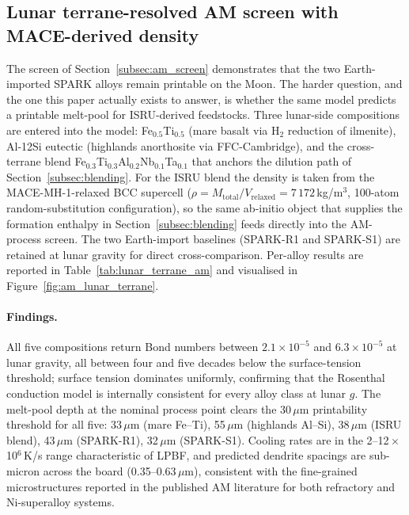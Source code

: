 \documentclass[11pt,a4paper]{article}
\begin{document}
\subsection{Lunar terrane-resolved AM screen with MACE-derived density}
\label{subsec:am_lunar_terranes}

The screen of Section~\ref{subsec:am_screen} demonstrates that the two Earth-imported SPARK alloys remain printable on the Moon. The harder question, and the one this paper actually exists to answer, is whether the same model predicts a printable melt-pool for ISRU-derived feedstocks. Three lunar-side compositions are entered into the model: Fe$_{0.5}$Ti$_{0.5}$ (mare basalt via H$_2$ reduction of ilmenite), Al-12Si eutectic (highlands anorthosite via FFC-Cambridge), and the cross-terrane blend Fe$_{0.3}$Ti$_{0.3}$Al$_{0.2}$Nb$_{0.1}$Ta$_{0.1}$ that anchors the dilution path of Section~\ref{subsec:blending}. For the ISRU blend the density is taken from the MACE-MH-1-relaxed BCC supercell ($\rho = M_\text{total} / V_\text{relaxed} = 7\,172$\,kg/m$^3$, 100-atom random-substitution configuration), so the same ab-initio object that supplies the formation enthalpy in Section~\ref{subsec:blending} feeds directly into the AM-process screen. The two Earth-import baselines (SPARK-R1 and SPARK-S1) are retained at lunar gravity for direct cross-comparison. Per-alloy results are reported in Table~\ref{tab:lunar_terrane_am} and visualised in Figure~\ref{fig:am_lunar_terrane}.

\paragraph{Findings.} All five compositions return Bond numbers between $2.1 \times 10^{-5}$ and $6.3 \times 10^{-5}$ at lunar gravity, all between four and five decades below the surface-tension threshold; surface tension dominates uniformly, confirming that the Rosenthal conduction model is internally consistent for every alloy class at lunar $g$. The melt-pool depth at the nominal process point clears the 30\,$\mu$m printability threshold for all five: 33\,$\mu$m (mare Fe--Ti), 55\,$\mu$m (highlands Al--Si), 38\,$\mu$m (ISRU blend), 43\,$\mu$m (SPARK-R1), 32\,$\mu$m (SPARK-S1). Cooling rates are in the 2--12\,$\times$\,10$^6$\,K/s range characteristic of LPBF, and predicted dendrite spacings are sub-micron across the board (0.35--0.63\,$\mu$m), consistent with the fine-grained microstructures reported in the published AM literature for both refractory and Ni-superalloy systems.
\end{document}
